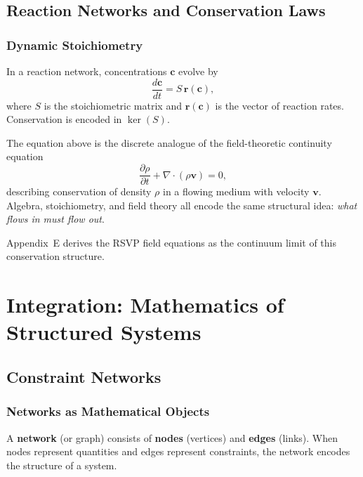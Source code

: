 \documentclass[11pt, openany]{book}
\theoremstyle{plain}
\theoremstyle{definition}
\theoremstyle{remark}
\newcommand{\pd}[2]{\frac{\partial #1}{\partial #2}}
\begin{document}
\chapter{Reaction Networks and Conservation Laws}

\section{Dynamic Stoichiometry}

In a reaction network, concentrations $\mathbf{c}$ evolve by
\[
  \frac{d\mathbf{c}}{dt} = S\,\mathbf{r}(\mathbf{c}),
\]
where $S$ is the stoichiometric matrix and $\mathbf{r}(\mathbf{c})$ is the
vector of reaction rates. Conservation is encoded in $\ker(S)$.

\begin{myexample}
The equation above is the discrete analogue of the field-theoretic continuity
equation
\[
  \pd{\rho}{t} + \nabla\cdot(\rho\mathbf{v}) = 0,
\]
describing conservation of density $\rho$ in a flowing medium with velocity
$\mathbf{v}$. Algebra, stoichiometry, and field theory all encode the same
structural idea: \emph{what flows in must flow out}.
\end{myexample}

\begin{deepnote}
Appendix~E derives the RSVP field equations as the continuum limit of this
conservation structure.
\end{deepnote}

\part{Integration: Mathematics of Structured Systems}

\chapter{Constraint Networks}

\section{Networks as Mathematical Objects}

A \textbf{network} (or graph) consists of \textbf{nodes} (vertices) and
\textbf{edges} (links). When nodes represent quantities and edges represent
constraints, the network encodes the structure of a system.
\end{document}
